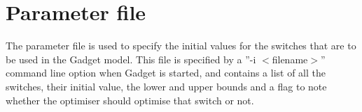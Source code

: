 \documentclass[10pt,titlepage]{article}
\begin{document}
{\small }

\section{Parameter file}
The parameter file is used to specify the initial values for the switches that are to be used in the Gadget model.  This file is specified by a ''-i $<$filename$>$'' command line option when Gadget is started, and  contains a list of all the switches, their initial value, the lower and upper bounds and a flag to note whether the optimiser should optimise that switch or not.

{\small }
\end{document}
